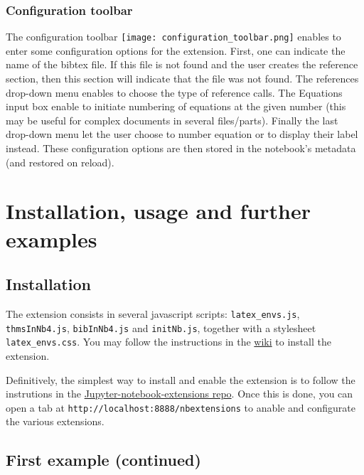     \subsubsection{Configuration toolbar}\label{configuration-toolbar}

    The configuration toolbar \texttt{[image: configuration\_toolbar.png]}
enables to enter some configuration options for the extension. First,
one can indicate the name of the bibtex file. If this file is not found
and the user creates the reference section, then this section will
indicate that the file was not found. The references drop-down menu
enables to choose the type of reference calls. The Equations input box
enable to initiate numbering of equations at the given number (this may
be useful for complex documents in several files/parts). Finally the
last drop-down menu let the user choose to number equation or to display
their label instead. These configuration options are then stored in the
notebook's metadata (and restored on reload).

    \section{Installation, usage and further
examples}\label{installation-usage-and-further-examples}

    \subsection{Installation}\label{installation}

    The extension consists in several javascript scripts:
\texttt{latex\_envs.js}, \texttt{thmsInNb4.js}, \texttt{bibInNb4.js} and
\texttt{initNb.js}, together with a stylesheet \texttt{latex\_envs.css}.
You may follow the instructions in the
\href{https://github.com/ipython-contrib/IPython-notebook-extensions/wiki}{wiki}
to install the extension.

Definitively, the simplest way to install and enable the extension is to
follow the instrutions in the
\href{https://github.com/ipython-contrib/Jupyter-notebook-extensions/blob/master/README.md}{Jupyter-notebook-extensions
repo}. Once this is done, you can open a tab at
\texttt{http://localhost:8888/nbextensions} to anable and configurate
the various extensions.

    \subsection{First example (continued)}\label{first-example-continued}

